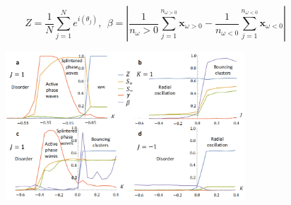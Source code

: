 \documentclass[10pt,aspectratio=43,mathserif,table]{beamer}
\begin{document}
\begin{frame}
    $$
    Z=\frac{1}{N}\sum_{j=1}^N{e^{i\left( \theta _j \right)}},\ \  \beta =\left| \frac{1}{n_{\omega}>0}\sum_{j=1}^{n_{\omega >0}}{\boldsymbol{x}_{\omega >0}}-\frac{1}{n_{\omega <0}}\sum_{j=1}^{n_{\omega <0}}{\boldsymbol{x}_{\omega <0}} \right|
    $$
    \begin{figure}
        \centering
        \includegraphics[width=0.8\textwidth]{fig3.jpg}
    \end{figure}
\end{frame}

\end{document}
